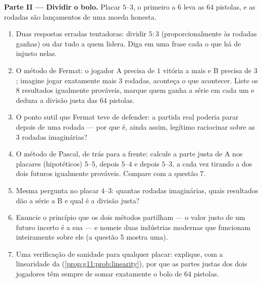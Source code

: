\begin{problem}
\medskip
\noindent\textbf{Parte II --- Dividir o bolo.}
Placar $5$--$3$, o primeiro a $6$ leva as $64$ pistolas, e as
rodadas são lançamentos de uma moeda honesta.
\begin{enumerate}[resume]
  \item Duas respostas erradas tentadoras: dividir $5 : 3$
        (proporcionalmente às rodadas ganhas) ou dar tudo a quem
        lidera. Diga em uma frase cada o que há de injusto
        nelas.
  \item O método de Fermat: o jogador A precisa de $1$ vitória a
        mais e B precisa de $3$; imagine jogar exatamente mais
        $3$ rodadas, aconteça o que acontecer. Liste os $8$
        resultados igualmente prováveis, marque quem ganha a
        série em cada um e deduza a divisão justa das $64$
        pistolas.
  \item O ponto sutil que Fermat teve de defender: a partida real
        poderia parar depois de uma rodada --- por que é, ainda
        assim, legítimo raciocinar sobre as $3$ rodadas
        imaginárias?
  \item O método de Pascal, de trás para a frente: calcule a
        parte justa de A nos placares (hipotéticos) $5$--$5$,
        depois $5$--$4$ e depois $5$--$3$, a cada vez tirando a
         dos dois futuros igualmente prováveis. Compare com
        a questão 7.
  \item Mesma pergunta no placar $4$--$3$: quantas rodadas
        imaginárias, quais resultados dão a série a B e qual é a
        divisão justa?
  \item Enuncie o princípio que os dois métodos partilham --- o
        valor justo de um futuro incerto é a sua
        \emph{} --- e nomeie duas indústrias modernas
        que funcionam inteiramente sobre ele (a questão 5 mostra
        uma).
  \item Uma verificação de sanidade para qualquer placar:
        explique, com a linearidade da 
        (\cref{prop:g11:prob:linearity}), por que as partes
        justas dos dois jogadores têm sempre de somar exatamente
        o bolo de $64$ pistolas.
\end{enumerate}


\end{problem}
